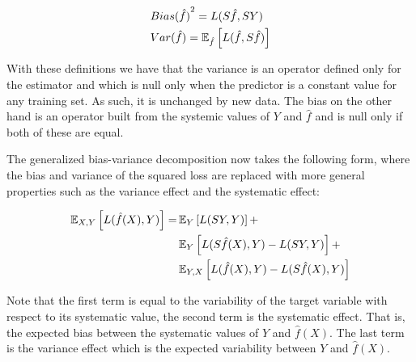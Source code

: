 \begin{equation}
\begin{split}
& {Bias(\hat{f})}^2 = L(S\hat{f},SY) \\
& Var(\hat{f}) = \operatorname{\mathbb{E}}_{\hat{f}} \left[ L(\hat{f} , S\hat{f}) \right]
\end{split}
\end{equation}

With these definitions we have that the variance is an operator defined only for the estimator and which is null only when the predictor is a constant value for any training set.
As such, it is unchanged by new data.
The bias on the other hand is an operator built from the systemic values of $Y$ and $\hat{f}$ and is null only if both of these are equal.

The generalized bias-variance decomposition now takes the following form, where the bias and variance of the squared loss are replaced with more general properties such as the variance effect and the systematic effect:

\begin{equation}
\begin{split}
\operatorname{\mathbb{E}}_{X,Y} \left[ L(\hat{f}(X),Y )\right] = & \operatorname{\mathbb{E}}_{Y} \left[ L(SY,Y )\right] + \\
 & \operatorname{\mathbb{E}}_{Y} \left[ L(S\hat{f}(X),Y ) - L(SY,Y )\right] + \\
 & \operatorname{\mathbb{E}}_{Y,X} \left[ L(\hat{f}(X),Y ) - L(S\hat{f}(X),Y )\right]
\end{split}
\end{equation}

Note that the first term is equal to the variability of the target variable with respect to its systematic value, the second term is the systematic effect.
That is, the expected bias between the systematic values of $Y$ and $\hat{f}(X)$.
The last term is the variance effect which is the expected variability between $Y$ and $\hat{f}(X)$.


